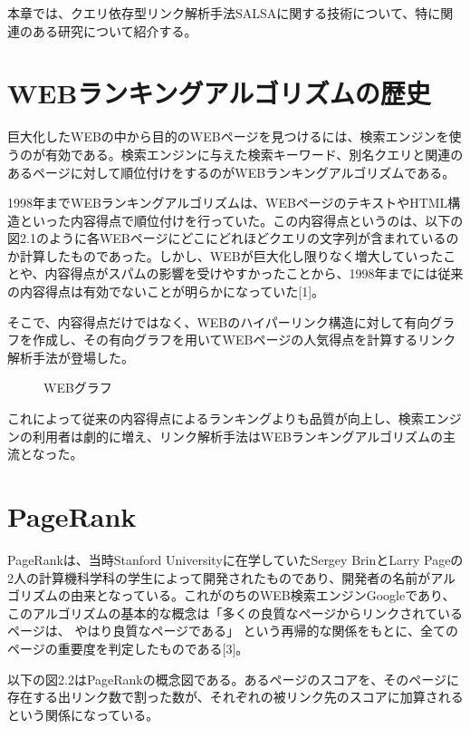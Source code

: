 \documentclass[a4paper,11pt]{jreport}
\begin{document}
本章では、クエリ依存型リンク解析手法SALSAに関する技術について、特に関連のある研究について紹介する。

\section{WEBランキングアルゴリズムの歴史}

巨大化したWEBの中から目的のWEBページを見つけるには、検索エンジンを使うのが有効である。検索エンジンに与えた検索キーワード、別名クエリと関連のあるページに対して順位付けをするのがWEBランキングアルゴリズムである。

1998年までWEBランキングアルゴリズムは、WEBページのテキストやHTML構造といった内容得点で順位付けを行っていた。この内容得点というのは、以下の図2.1のように各WEBページにどこにどれほどクエリの文字列が含まれているのか計算したものであった。しかし、WEBが巨大化し限りなく増大していったことや、内容得点がスパムの影響を受けやすかったことから、1998年までには従来の内容得点は有効でないことが明らかになっていた[1]。

そこで、内容得点だけではなく、WEBのハイパーリンク構造に対して有向グラフを作成し、その有向グラフを用いてWEBページの人気得点を計算するリンク解析手法が登場した。

\begin{figure}[htbp]
\begin{center}
\end{center}
\caption{WEBグラフ}
\label{figure:sample}
\end{figure}

これによって従来の内容得点によるランキングよりも品質が向上し、検索エンジンの利用者は劇的に増え、リンク解析手法はWEBランキングアルゴリズムの主流となった。


\section{PageRank}

PageRankは、当時Stanford Universityに在学していたSergey BrinとLarry Pageの2人の計算機科学科の学生によって開発されたものであり、開発者の名前がアルゴリズムの由来となっている。これがのちのWEB検索エンジンGoogleであり、このアルゴリズムの基本的な概念は「多くの良質なページからリンクされているページは、 やはり良質なページである」 という再帰的な関係をもとに、全てのページの重要度を判定したものである[3]。

以下の図2.2はPageRankの概念図である。あるページのスコアを、そのページに存在する出リンク数で割った数が、それぞれの被リンク先のスコアに加算されるという関係になっている。
\end{document}
